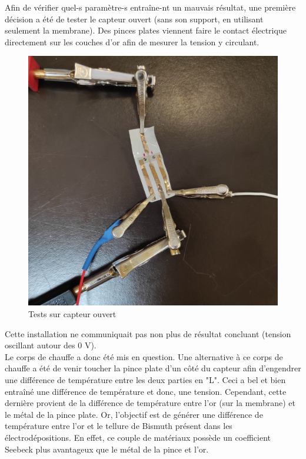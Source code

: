 Afin de vérifier quel-s paramètre-s entraîne-nt un mauvais résultat, une première décision a été de tester le \gls{capteur} ouvert (sans son support,
en utilisant seulement la membrane).
Des pinces plates viennent faire le contact électrique directement sur les couches d'or afin de mesurer la tension y circulant.
\begin{figure}[H]
    \centering
    \includegraphics[scale = 0.05]{assets/figures/CapteurOuvert.jpg}
    \caption{Tests sur capteur ouvert}
    \label{fig:capteurOuvert}
\end{figure}
Cette installation ne communiquait pas non plus de résultat concluant (tension oscillant autour des 0 V). \\

Le corps de chauffe a donc été mis en question. Une alternative à ce corps de chauffe a été de venir toucher la pince plate d'un côté du
capteur afin d'engendrer une différence de température entre les deux parties en "L". Ceci a bel et bien entraîné une différence de
température et donc, une tension. Cependant, cette dernière provient de la différence de température entre l'or (sur la membrane) et le métal
de la pince plate. Or, l'objectif est de générer une différence de température entre l'or et le tellure de Bismuth présent dans les électrodépositions. 
En effet, ce couple de matériaux possède un coefficient Seebeck plus avantageux que le métal de la pince et l'or. \\

